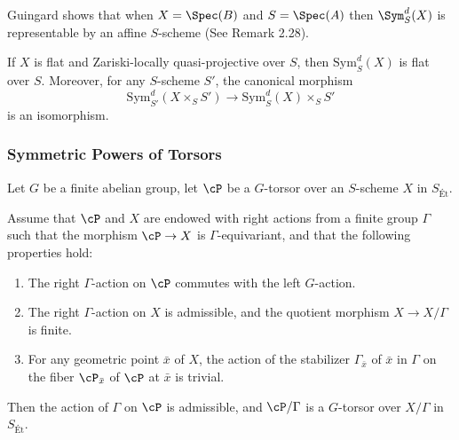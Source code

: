 Guingard shows that when $X=\Spec(B)$ and $S=\Spec(A)$ then $\Sym_{S}^d(X)$ is representable by an affine $S$-scheme (See \cite{Guignard2018} Remark 2.28).

\begin{prop}\label{prop:symmetric_power_flat_base_change}
If $X$ is flat and Zariski-locally quasi-projective over $S$, then $\text{Sym}_S^d(X)$ is flat over $S$. Moreover, for any $S$-scheme $S'$, the canonical morphism
\[
\text{Sym}_{S'}^d(X \times_S S') \to \text{Sym}_S^d(X) \times_S S'
\]
is an isomorphism.
\end{prop}


\subsubsection*{Symmetric Powers of Torsors}
Let $G$ be a finite abelian group, let $\cP$ be a $G$-torsor over an $S$-scheme $X$ in $S_{\text{Ét}}$. 


\begin{prop}
Assume that $\cP$ and $X$ are endowed with right actions from a finite group $\Gamma$ 
such that the morphism $\cP \to X$ is $\Gamma$-equivariant, and that the following properties hold:
\begin{enumerate}
    \item[(a)] The right $\Gamma$-action on $\cP$ commutes with the left $G$-action.
    \item[(b)] The right $\Gamma$-action on $X$ is admissible, and the quotient morphism $X \to X/\Gamma$ is finite.
    \item[(c)] For any geometric point $\bar{x}$ of $X$, the action of the stabilizer $\Gamma_{\bar{x}}$ of $\bar{x}$ in $\Gamma$ on the fiber $\cP_{\bar{x}}$ of $\cP$ at $\bar{x}$ is trivial.
\end{enumerate}
Then the action of $\Gamma$ on $\cP$ is admissible, and $\cP/\Gamma$ is a $G$-torsor over $X/\Gamma$ in $S_{\text{Ét}}$.
\end{prop}

